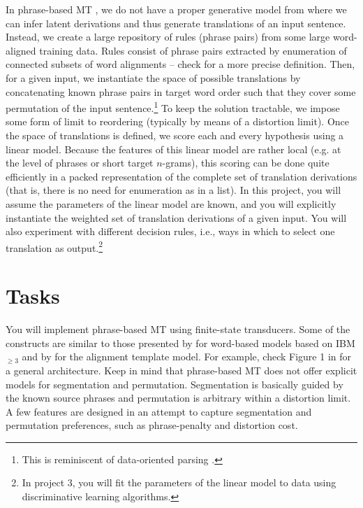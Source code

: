 In phrase-based MT \citep{Koehn+2003:pbsmt}, we do not have a proper generative model from where we can infer latent derivations and thus generate translations of an input sentence.
Instead, we create a large repository of rules (phrase pairs) from some large word-aligned training data.
Rules consist of phrase pairs extracted by enumeration of connected subsets of word alignments -- check \citep{Koehn+2003:pbsmt} for a more precise definition.
Then, for a given input, we instantiate the space of possible translations by concatenating known phrase pairs in target word order such that they cover some permutation of the input sentence.\footnote{This is reminiscent of data-oriented parsing \citep{Bod:1992:DOP}.}
To keep the solution tractable, we impose some form of limit to reordering (typically by means of a distortion limit).
Once the space of translations is defined, we score each and every hypothesis using a linear model.
Because the features of this linear model are rather local (e.g. at the level of phrases or short target $n$-grams), this scoring can be done quite efficiently in a packed representation of the complete set of translation derivations (that is, there is no need for enumeration as in a list).
In this project, you will assume the parameters of the linear model are known, and you will explicitly instantiate the weighted set of translation derivations of a given input.
You will also experiment with different decision rules, i.e., ways in which to select one translation as output.\footnote{In project 3, you will fit the parameters of the linear model to data using discriminative learning algorithms.}

\section{Tasks}

You will implement phrase-based MT using finite-state transducers. 
Some of the constructs are similar to those presented by \citet{Knight+1998:WBFST} for word-based models based on IBM$_{\ge 3}$ and by \citet{Kumar+2003:WFST} for the alignment template model.
For example, check Figure 1 in \citep{Kumar+2003:WFST} for a general architecture. 
Keep in mind that phrase-based MT does not offer explicit models for segmentation and permutation. Segmentation is basically guided by the known source phrases and permutation is arbitrary within a distortion limit. 
A few features are designed in an attempt to capture segmentation and permutation preferences, such as phrase-penalty and distortion cost.










